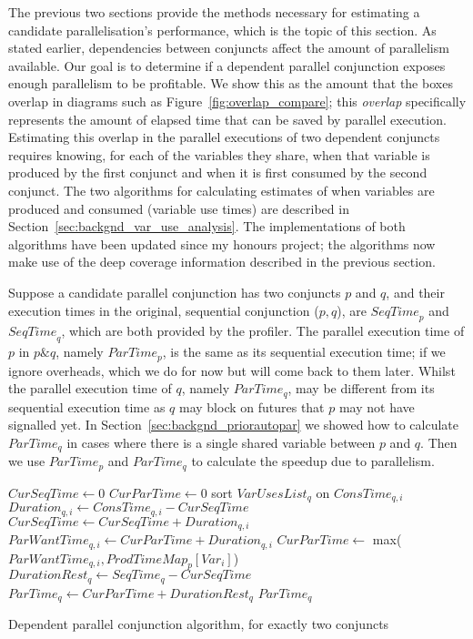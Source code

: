 
The previous two sections provide the methods necessary for
estimating a candidate parallelisation's performance,
which is the topic of this section.
As stated earlier,
dependencies between conjuncts affect the amount of parallelism
available.
Our goal is to determine if a dependent parallel conjunction exposes enough
parallelism to be profitable.
We show this as the amount that the boxes overlap
in diagrams such as Figure~\ref{fig:overlap_compare};
this \emph{overlap} specifically represents the amount of elapsed time that can be
saved by parallel execution.
Estimating this overlap
in the parallel executions of two dependent conjuncts
requires knowing, for each of the variables they share,
when that variable is produced by the first conjunct and
when it is first consumed by the second conjunct.
The two algorithms for calculating estimates of when variables are produced and
consumed
(variable use times)
are described in Section~\ref{sec:backgnd_var_use_analysis}.
The implementations of both algorithms have been updated since my honours
project;
the algorithms now make use of the deep coverage information described in
the previous section.

Suppose a candidate parallel conjunction has two conjuncts $p$ and $q$,
and their execution times in the original, sequential conjunction ($p, q$),
are ${SeqTime}_p$ and ${SeqTime}_q$, which are both provided by the profiler.
The parallel execution time of $p$ in $p \& q$, namely $ParTime_p$,
is the same as its sequential execution time;
if we ignore overheads,
which we do for now but will come back to them later.
Whilst the parallel execution time of $q$, namely $ParTime_q$, may be
different from its sequential execution time as $q$ may block on futures
that $p$ may not have signalled yet.
In Section~\ref{sec:backgnd_priorautopar} we showed how to calculate
$ParTime_q$ in cases where there is a single shared variable between $p$ and
$q$.
Then we use $ParTime_p$ and $ParTime_q$ to calculate the speedup due to
parallelism.

\begin{algorithm}[tbp]
\begin{algorithmic}[1]
\State $CurSeqTime \gets 0$
\State $CurParTime \gets 0$
\State sort $VarUsesList_q$ on $ConsTime_{q, i}$
    \State $Duration_{q, i} \gets ConsTime_{q, i} - CurSeqTime$
    \State $CurSeqTime \gets CurSeqTime + Duration_{q, i}$
    \State $ParWantTime_{q, i} \gets CurParTime + Duration_{q, i}$
    \State $CurParTime \gets$ max($ParWantTime_{q, i}, ProdTimeMap_{p}[Var_i]$)
\EndFor
\State $DurationRest_q \gets SeqTime_q - CurSeqTime$
\State $ParTime_q \gets CurParTime + DurationRest_q$
\State \Return $ParTime_q$
\EndProcedure
\end{algorithmic}
\caption{Dependent parallel conjunction algorithm, for exactly two conjuncts}
\label{alg:dep_par_conj_overlap_simple}
\end{algorithm}

